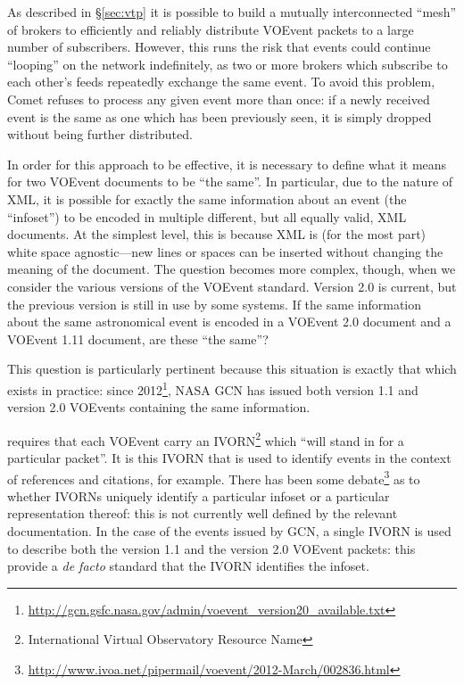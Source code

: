 \documentclass[5p,authoryear]{elsarticle}
\begin{document}
As described in \S\ref{sec:vtp} it is possible to build a mutually
interconnected ``mesh'' of brokers to efficiently and reliably distribute
VOEvent packets to a large number of subscribers. However, this runs the risk
that events could continue ``looping'' on the network indefinitely, as two or
more brokers which subscribe to each other's feeds repeatedly exchange the
same event. To avoid this problem, Comet refuses to process any given event
more than once: if a newly received event is the same as one which has been
previously seen, it is simply dropped without being further distributed.

In order for this approach to be effective, it is necessary to define what it
means for two VOEvent documents to be ``the same''. In particular, due to the
nature of XML, it is possible for exactly the same information about an event
(the ``infoset'') to be encoded in multiple different, but all equally valid,
XML documents. At the simplest level, this is because XML is (for the most
part) white space agnostic---new lines or spaces can be inserted without
changing the meaning of the document. The question becomes more complex,
though, when we consider the various versions of the VOEvent standard. Version
2.0 \citep{Seaman:2011} is current, but the previous version
\citep[1.1;][]{Seaman:2006} is still in use by some systems. If the same
information about the same astronomical event is encoded in a VOEvent 2.0
document and a VOEvent 1.11 document, are these ``the same''?

This question is particularly pertinent because this situation is exactly that
which exists in practice: since
2012\footnote{\url{http://gcn.gsfc.nasa.gov/admin/voevent_version20_available.txt}},
NASA GCN has issued both version 1.1 and version 2.0 VOEvents containing the
same information.

\citet{Seaman:2011} requires that each VOEvent carry an
IVORN\footnote{International Virtual Observatory Resource Name} which ``will
stand in for a particular packet''. It is this IVORN that is used to identify
events in the context of references and citations, for example. There has been
some
debate\footnote{\url{http://www.ivoa.net/pipermail/voevent/2012-March/002836.html}}
as to whether IVORNs uniquely identify a particular infoset or a particular
representation thereof: this is not currently well defined by the relevant
documentation. In the case of the events issued by GCN, a single IVORN is used
to describe both the version 1.1 and the version 2.0 VOEvent packets: this
provide a \textit{de facto} standard that the IVORN identifies the infoset.
\end{document}

